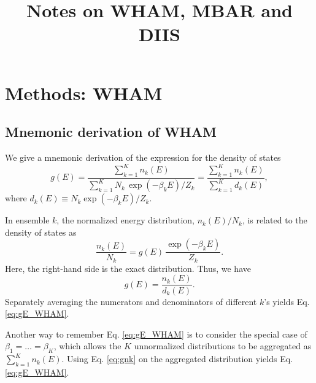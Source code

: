 \documentclass[aip,jcp,preprint,notitlepage, superscriptaddress]{revtex4-1}
\begin{document}
\renewcommand{\theequation}{N.\arabic{equation}}

\newcommand{\vct}[1]{\mathbf{#1}}
\newcommand{\vx}{\vct{x}}
\newcommand{\vy}{\vct{y}}
\newcommand{\Z}{\mathcal{Z}}
\newcommand{\E}{\mathcal{E}}
\newcommand{\Ham}{\mathcal{H}}
\newcommand{\W}{\mathcal{W}}




\title{Notes on WHAM, MBAR and DIIS}

\maketitle


\tableofcontents



\section{Methods: WHAM}



\subsection{Mnemonic derivation of WHAM}



We give a mnemonic derivation of the expression
for the density of states
%
\begin{equation}
g(E)
=
\frac{
  \sum_{k = 1}^K n_k(E)
}
{
  \sum_{k = 1}^K N_k \, \exp(-\beta_k E) / Z_k
}
=
\frac{
  \sum_{k = 1}^K n_k(E)
}
{
  \sum_{k = 1}^K d_k(E)
},
\label{eq:gE_WHAM}
\end{equation}
%
where
$d_k(E) \equiv N_k \exp(-\beta_k E) / Z_k$.



In ensemble $k$,
the normalized energy distribution,
$n_k(E) / N_k$,
is related to the density of states as
%
\begin{equation}
\frac{ n_k(E) } { N_k }
=
g(E) \,
\frac{ \exp(-\beta_k E) } { Z_k }.
\end{equation}
%
Here, the right-hand side
is the exact distribution.
%
Thus,
we have
%
\begin{equation}
g(E)
=
\frac{ n_k(E) }
     { d_k(E) }.
\label{eq:gnk}
\end{equation}
%
Separately averaging the numerators and denominators of different $k$'s
yields Eq. \eqref{eq:gE_WHAM}.



Another way to remember Eq. \eqref{eq:gE_WHAM}
is to consider the special case of
$\beta_1 = \dots = \beta_K$,
which allows
the $K$ unnormalized distributions
to be aggregated as
$\sum_{k=1}^K n_k(E)$.
%
Using Eq. \eqref{eq:gnk}
on the aggregated distribution
yields Eq. \eqref{eq:gE_WHAM}.
\end{document}
